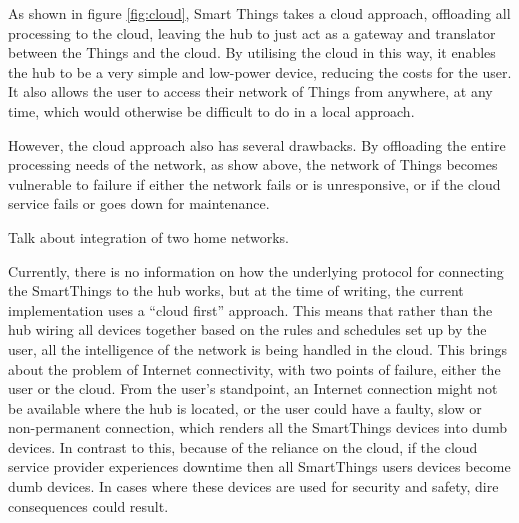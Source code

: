 As shown in figure \ref{fig:cloud}, Smart Things takes a cloud approach, offloading all processing to the cloud, leaving the hub to just act as a gateway and translator between the Things and the cloud. By utilising the cloud in this way, it enables the hub to be a very simple and low-power device, reducing the costs for the user. It also allows the user to access their network of Things from anywhere, at any time, which would otherwise be difficult to do in a local approach. 

However, the cloud approach also has several drawbacks. By offloading the entire processing needs of the network, as show above, the network of Things becomes vulnerable to failure if either the network fails or is unresponsive, or if the cloud service fails or goes down for maintenance. 

Talk about integration of two home networks.


Currently, there is no information on how the underlying protocol for connecting the SmartThings to the hub works, but at the time of writing, the current implementation uses a ``cloud first'' approach. This means that rather than the hub wiring all devices together based on the rules and schedules set up by the user, all the intelligence of the network is being handled in the cloud. This brings about the problem of Internet connectivity, with two points of failure, either the user or the cloud. From the user's standpoint, an Internet connection might not be available where the hub is located, or the user could have a faulty, slow or non-permanent connection, which renders all the SmartThings devices into dumb devices. In contrast to this, because of the reliance on the cloud, if the cloud service provider experiences downtime then all SmartThings users devices become dumb devices. In cases where these devices are used for security and safety, dire consequences could result.

